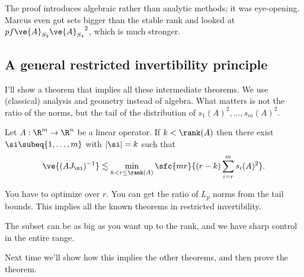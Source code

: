 The proof introduces algebraic rather than analytic methods; it was eye-opening. Marcus even got sets bigger than the stable rank and looked at $pf{\ve{A}_{S_2}}{\ve{A}_{S_4}}^2$, which is much stronger.

\subsection{A general restricted invertibility principle}

I'll show a theorem that implies all these intermediate theorems. We use (classical) analysis and geometry instead of algebra.
What matters is not the ratio of the norms, but the tail of the distribution of $s_1(A)^2,\ldots, s_m(A)^2$.
\begin{thm}
Let $A:\R^m\to \R^n$ be a linear operator. If $k<\rank(A)$  then there exist $\si\subeq \{1,\ldots, m\}$ with $|\si|=k$ such that 
\[
\ve{(AJ_\si)^{-1}} \lesssim \min_{k<r\le \rank(A)}\sfc{mr}{(r-k) \sum_{i=r}^m s_i(A)^2}.
\]
\end{thm}
You have to optimize over $r$. You can get the ratio of $L_p$ norms from the tail bounds. This implies all the known theorems in restricted invertibility.

The subset can be as big as you want up to the rank, and we have sharp control in the entire range.

Next time we'll show how this implies the other theorems, and then prove the theorem. %